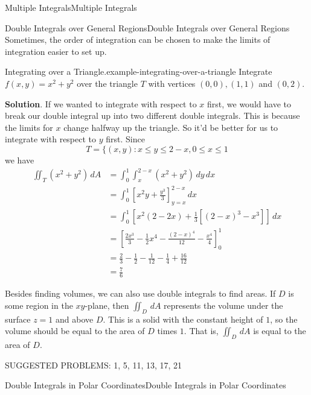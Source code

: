 \documentclass[10pt,]{book}
\numberwithin{equation}{section}
\begin{document}
\begin{chapterptx}{Multiple Integrals}{}{Multiple Integrals}{}{}
\begin{sectionptx}{Double Integrals over General Regions}{}{Double Integrals over General Regions}{}{}
\hypertarget{p-1262}{}%
Sometimes, the order of integration can be chosen to make the limits of integration easier to set up.%
\begin{example}{Integrating over a Triangle.}{example-integrating-over-a-triangle}%
\hypertarget{p-1263}{}%
Integrate \(f(x,y) = x^{2} + y^{2}\) over the triangle \(T\) with vertices \((0,0), (1,1)\) and \((0,2)\).%
\par\smallskip%
\noindent\textbf{Solution}.\hypertarget{solution-201}{}\quad%
\hypertarget{p-1264}{}%
If we wanted to integrate with respect to \(x\) first, we would have to break our double integral up into two different double integrals. This is because the limits for \(x\) change halfway up the triangle. So it'd be better for us to integrate with respect to \(y\) first. Since%
\begin{equation*}
T = \{(x,y) : x \leq y \leq 2-x, 0\leq x\leq 1
\end{equation*}
we have%
\begin{align*}
\iint_{T}(x^{2} + y^{2})\,dA & = \int_{0}^{1}\int_{x}^{2-x}(x^{2} + y^{2})\,dy\,dx \\
& = \int_{0}^{1}\left[x^{2}y + \frac{y^{3}}{3}\right]_{y=x}^{2-x}\,dx \\
& = \int_{0}^{1} \left[x^{2}(2-2x) + \frac{1}{3}[(2-x)^{3} - x^{3}]\right]\,dx \\
& = \left[\frac{2x^{3}}{3} - \frac{1}{2}x^{4} - \frac{(2-x)^{4}}{12} - \frac{x^{4}}{4}\right]_{0}^{1} \\
& = \frac{2}{3} - \frac{1}{2} - \frac{1}{12} - \frac{1}{4} + \frac{16}{12} \\
& = \frac{7}{6} 
\end{align*}
%
\end{example}
\hypertarget{p-1265}{}%
Besides finding volumes, we can also use double integrals to find areas. If \(D\) is some region in the \(xy\)-plane, then \(\iint_{D}\,dA\) represents the volume under the surface \(z=1\) and above \(D\). This is a solid with the constant height of \(1\), so the volume should be equal to the area of \(D\) times \(1\). That is, \(\iint_{D}\,dA\) is equal to the area of \(D\).%
\par
\hypertarget{p-1266}{}%
SUGGESTED PROBLEMS: 1, 5, 11, 13, 17, 21%
\end{sectionptx}
%
%
\typeout{************************************************}
\typeout{************************************************}
%
\begin{sectionptx}{Double Integrals in Polar Coordinates}{}{Double Integrals in Polar Coordinates}{}{}\label{section-double-integrals-in-polar-coordinates}

\end{sectionptx}
\end{chapterptx}
\end{document}
